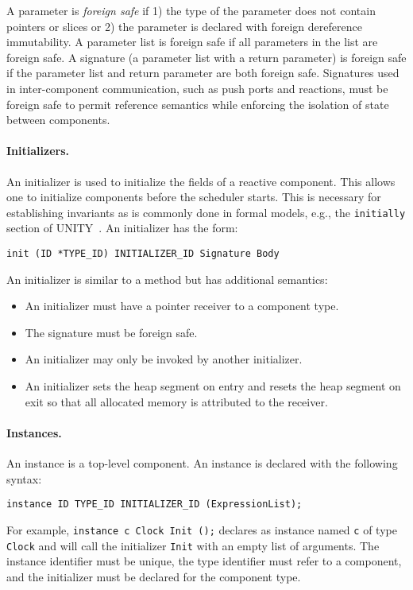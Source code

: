 A parameter is \emph{foreign safe} if 1) the type of the parameter does not contain pointers or slices or 2) the parameter is declared with foreign dereference immutability.
A parameter list is foreign safe if all parameters in the list are foreign safe.
A signature (a parameter list with a return parameter) is foreign safe if the parameter list and return parameter are both foreign safe.
Signatures used in inter-component communication, such as push ports and reactions, must be foreign safe to permit reference semantics while enforcing the isolation of state between components.

\paragraph{Initializers.}
An initializer is used to initialize the fields of a reactive component.
This allows one to initialize components before the scheduler starts.
This is necessary for establishing invariants as is commonly done in formal models, e.g., the \verb+initially+ section of UNITY~\cite{chandy1989parallel}.
An initializer has the form:
\begin{verbatim}
init (ID *TYPE_ID) INITIALIZER_ID Signature Body
\end{verbatim}
An initializer is similar to a method but has additional semantics:
\begin{itemize}
\item An initializer must have a pointer receiver to a component type.
\item The signature must be foreign safe.
\item An initializer may only be invoked by another initializer.
\item An initializer sets the heap segment on entry and resets the heap segment on exit so that all allocated memory is attributed to the receiver.
\end{itemize}

\paragraph{Instances.}
An instance is a top-level component.
An instance is declared with the following syntax:
\begin{verbatim}
instance ID TYPE_ID INITIALIZER_ID (ExpressionList);
\end{verbatim}
For example, \verb+instance c Clock Init ();+ declares as instance named \verb+c+ of type \verb+Clock+ and will call the initializer \verb+Init+ with an empty list of arguments.
The instance identifier must be unique, the type identifier must refer to a component, and the initializer must be declared for the component type.

